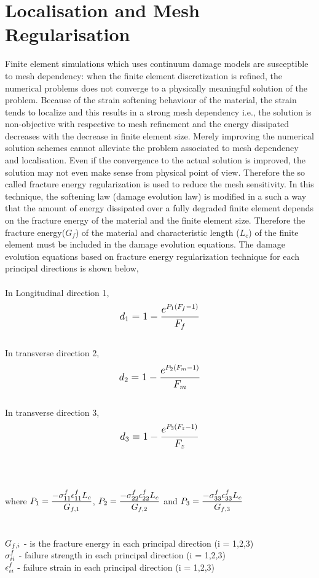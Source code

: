 \documentclass[a4paper,12pt,twoside]{report}
\begin{document}
\section{Localisation and Mesh Regularisation}\label{Mesh Regularisation}
\indent\indent\indent Finite element simulations which uses continuum damage models are susceptible to mesh dependency: when the finite element discretization is refined, the numerical problems does not converge to a physically meaningful solution of the problem. Because of the strain softening behaviour of the material, the strain tends to localize and this results in a strong mesh dependency i.e., the solution is non-objective with respective to mesh refinement and the energy dissipated  decreases with the decrease in finite element size. Merely improving the numerical solution schemes cannot alleviate the problem associated to mesh dependency and localisation. Even if the convergence to the actual solution is improved, the solution may not even make sense from physical point of view. Therefore the so called fracture energy regularization is used to reduce the mesh sensitivity. In this technique, the softening law (damage evolution law) is modified in a such a way that the amount of energy dissipated over a fully degraded finite element depends on the fracture energy of the material and the finite element size. Therefore the fracture energy($G_f$) of the material and characteristic length ($L_{c}$) of the finite element must be included in the damage evolution equations. The damage evolution equations based on fracture energy regularization
technique for each principal directions is shown below, 
\\
\\
In Longitudinal direction 1,
\begin{equation}
\mathlarger{d_{1} = 1 - \frac{e^{P_{1}(F_{f} - 1)}}{F_{f}}}
\label{d1}
\end{equation}
\\
In transverse direction 2,
\begin{equation}
\mathlarger{d_{2} = 1 - \frac{e^{P_{2}(F_{m} - 1)}}{F_{m}}}
\label{d2}   
\end{equation}
\\
In transverse direction 3,
\begin{equation}
\mathlarger{d_{3} = 1 - \frac{e^{P_{3}(F_{z} - 1)}}{F_{z}}}
\label{d3}   
\end{equation}
\\
\\
\\
where $\mathlarger{P_{1} = \frac{-\sigma_{11}^{f}\epsilon_{11}^{f}L_{c}}{G_{f,1}}}$, $\mathlarger{P_{2} = \frac{-\sigma_{22}^{f}\epsilon_{22}^{f}L_{c}}{G_{f,2}}}$ and $\mathlarger{P_{3} = \frac{-\sigma_{33}^{f}\epsilon_{33}^{f}L_{c}}{G_{f,3}}}$ 
\\ 
\\ 
\\
$\mathlarger{G_{f,i}}$ \; - \;is the fracture energy in each principal direction (i = 1,2,3)  \\ $\mathlarger{\sigma_{ii}^{f}}$ \;\;\; -  \;  failure strength in each principal direction (i = 1,2,3) \\ $\mathlarger{\epsilon_{ii}^{f}}$\;\;\;\;\; - \; failure strain in each principal direction (i = 1,2,3)
\end{document}
